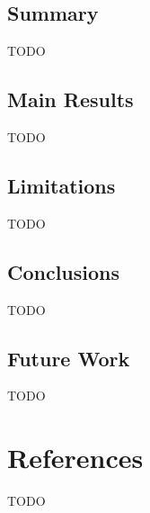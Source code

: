 \documentclass[a4paper,11pt]{article}
\begin{document}
    \vspace{0.5cm}
    \subsection{Summary}
        TODO

    \vspace{0.5cm}
    \subsection{Main Results}
        TODO

    \vspace{0.5cm}
    \subsection{Limitations}
        TODO
        
    \vspace{0.5cm}
    \subsection{Conclusions}
        TODO

    \vspace{0.5cm}
    \subsection{Future Work}
        TODO

    \clearpage %
    \section{References}\label{sec:references}
        \printbibliography[heading=none]
        TODO
        
\end{document}
